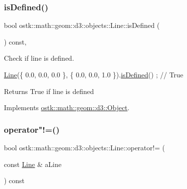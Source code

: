 \subsubsection{\texorpdfstring{is\+Defined()}{isDefined()}}
{\footnotesize\ttfamily bool ostk\+::math\+::geom\+::d3\+::objects\+::\+Line\+::is\+Defined (\begin{DoxyParamCaption}{ }\end{DoxyParamCaption}) const\hspace{0.3cm}{\ttfamily [override]}, {\ttfamily [virtual]}}



Check if line is defined. 


\begin{DoxyCode}
\hyperlink{classostk_1_1math_1_1geom_1_1d3_1_1objects_1_1_line_a9ebdaaf67a4bd91780808f8683463ebe}{Line}(\{ 0.0, 0.0, 0.0 \}, \{ 0.0, 0.0, 1.0 \}).\hyperlink{classostk_1_1math_1_1geom_1_1d3_1_1objects_1_1_line_a092640b8e18d71c734185f326698f518}{isDefined}() ; \textcolor{comment}{// True}
\end{DoxyCode}


\begin{DoxyReturn}{Returns}
True if line is defined 
\end{DoxyReturn}


Implements \hyperlink{classostk_1_1math_1_1geom_1_1d3_1_1_object_a271a1964cd208be85ce9a0a429395ad8}{ostk\+::math\+::geom\+::d3\+::\+Object}.

\mbox{\label{classostk_1_1math_1_1geom_1_1d3_1_1objects_1_1_line_ae2dad60d3d1b08f5d17a2d87839d0830}} 
\subsubsection{\texorpdfstring{operator"!=()}{operator!=()}}
{\footnotesize\ttfamily bool ostk\+::math\+::geom\+::d3\+::objects\+::\+Line\+::operator!= (\begin{DoxyParamCaption}\item[{const \hyperlink{classostk_1_1math_1_1geom_1_1d3_1_1objects_1_1_line}{Line} \&}]{a\+Line }\end{DoxyParamCaption}) const}



